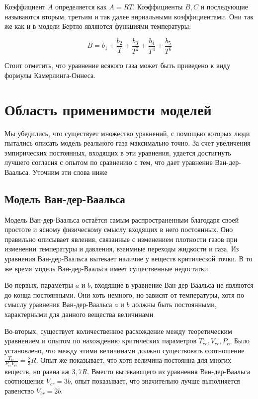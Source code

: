 \documentclass[a4paper, 14pt]{article}
\begin{document}
    Коэффициент $A$ определяется как $A = RT$.
    Коэффициенты $B, C$ и последующие называются вторым, третьим и так далее вириальными коэффициентами.
    Они так же как и в модели Бертло являются функциями температуры:

    \[ B = b_1 + \frac{b_2}{T} + \frac{b_3}{T^2} + \frac{b_4}{T^4} + \frac{b_5}{T^6} \]

    Стоит отметить, что уравнение всякого газа может быть приведено к виду формулы Камерлинга-Оннеса.

    \section*{Область применимости моделей} 

    Мы убедились, что существует множество уравнений, с помощью которых люди пытались описать модель реального газа
    максимально точно.
    За счет увеличения эмпирических постоянных, входящих в эти уравнения, удается достигнуть лучшего согласия с
    опытом по сравнению с тем, что дает уравнение Ван-дер-Ваальса.
    Уточним эти слова ниже

    \subsection*{Модель Ван-дер-Ваальса} 

    Модель Ван-дер-Ваальса остаётся самым распространенным благодаря своей простоте и ясному физическому
    смыслу входящих в него постоянных.
    Оно правильно описывает явления, связанные с изменением плотности газов при изменении температуры и давления,
    взаимные переходы жидкости и газа.
    Из уравнения Ван-дер-Ваальса вытекает наличие у веществ критической точки.
    В то же время модель Ван-дер-Ваальса имеет существенные недостатки

    Во-первых, параметры $a$ и $b$, входящие в уравнение Ван-дер-Ваальса не являются до конца постоянными.
    Они хоть немного, но зависят от температуры, хотя по смыслу уравнения Ван-дер-Ваальса $a$ и $b$ должны быть
    постоянными, характерными для данного вещества величинами

    Во-вторых, существует количественное расхождение между теоретическим уравнением и опытом по нахождению
    критических параметров $T_{cr}, V_{cr}, P_{cr}$
    Было установлено, что между этими величинами должно существовать соотношение $\frac{T_{cr}}{P_{cr}V_{cr}} =
    \frac{8}{3}R$.
    Опыт же показывает, что хотя величина постоянна для многих веществ, но равна аж $3,7 R$.
    Вместо вытекающего из уравнения Ван-дер-Ваальса соотношения $V_{cr}=3 b$, опыт показывает, что значительно лучше
    выполняется равенство $V_{cr} = 2b$.
\end{document}
